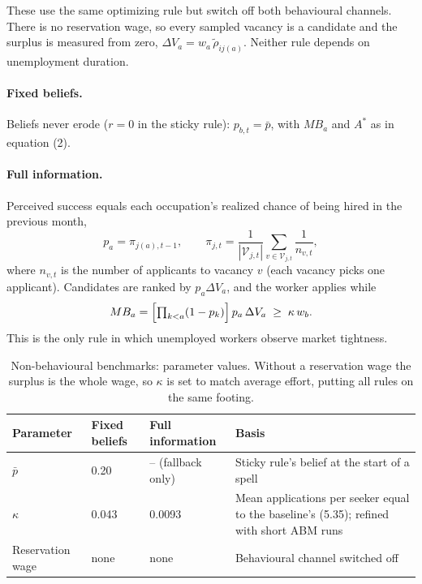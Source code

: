 \documentclass[11pt]{article}
\begin{document}
These use the same optimizing rule but switch off both behavioural channels. There is no reservation wage, so every
sampled vacancy is a candidate and the surplus is measured from zero, $\Delta V_a = w_a\,\tilde\rho_{i j(a)}$. Neither
rule depends on unemployment duration.

\paragraph{Fixed beliefs.}
Beliefs never erode ($r=0$ in the sticky rule): $p_{b,t} = \bar p$, with $MB_a$ and $A^*$ as in equation (2).

\paragraph{Full information.}
Perceived success equals each occupation's realized chance of being hired in the previous month,
\begin{equation}
p_a = \pi_{j(a),t-1}, \qquad \pi_{j,t} = \frac{1}{|\mathcal{V}_{j,t}|}\sum_{v\in \mathcal{V}_{j,t}} \frac{1}{n_{v,t}},
\end{equation}
where $n_{v,t}$ is the number of applicants to vacancy $v$ (each vacancy picks one applicant). Candidates are ranked by
$p_a\Delta V_a$, and the worker applies while
\begin{equation}
MB_a = \Bigl[\textstyle\prod_{k<a}(1-p_k)\Bigr]\,p_a\,\Delta V_a \;\ge\; \kappa\, w_b .
\end{equation}
This is the only rule in which unemployed workers observe market tightness.

\begin{table}[H]
\centering
\small
\begin{tabularx}{\linewidth}{@{}lllX@{}}
\toprule
Parameter & Fixed beliefs & Full information & Basis \\
\midrule
$\bar p$ & 0.20 & -- (fallback only) & Sticky rule's belief at the start of a spell \\
$\kappa$ & 0.043 & 0.0093 & Mean applications per seeker equal to the baseline's (5.35); refined with short ABM runs \\
Reservation wage & none & none & Behavioural channel switched off \\
\bottomrule
\end{tabularx}
\caption{Non-behavioural benchmarks: parameter values. Without a reservation wage the surplus is the whole wage, so
$\kappa$ is set to match average effort, putting all rules on the same footing.}
\end{table}
\end{document}

